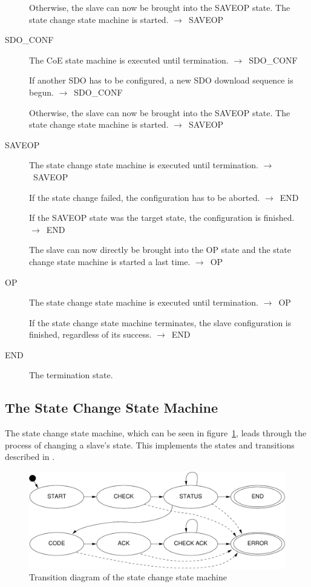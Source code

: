 \documentclass[a4paper,12pt,BCOR6mm,bibtotoc,idxtotoc]{scrbook}
\begin{document}
\begin{description}
  Otherwise, the slave can now be brought into the SAVEOP state. The
  state change state machine is started.
  $\rightarrow$~SAVEOP

\item[SDO\_CONF] The CoE state machine is executed until termination.
  $\rightarrow$~SDO\_CONF

  If another SDO has to be configured, a new SDO download sequence is
  begun. $\rightarrow$~SDO\_CONF

  Otherwise, the slave can now be brought into the SAVEOP state. The
  state change state machine is started.
  $\rightarrow$~SAVEOP

\item[SAVEOP] The state change state machine is executed until
  termination. $\rightarrow$~SAVEOP

  If the state change failed, the configuration has to be aborted.
  $\rightarrow$~END

  If the SAVEOP state was the target state, the configuration is
  finished. $\rightarrow$~END

  The slave can now directly be brought into the OP state and the
  state change state machine is started a last time.
  $\rightarrow$~OP

\item[OP] The state change state machine is executed until
  termination. $\rightarrow$~OP

  If the state change state machine terminates, the slave
  configuration is finished, regardless of its success.
  $\rightarrow$~END

\item[END] The termination state.

\end{description}


\subsection{The State Change State Machine}
\label{sec:fsm-change}

The state change state machine, which can be seen in
figure~\ref{fig:fsm-change}, leads through the process of changing a
slave's state. This implements the states and transitions described in
\cite[section~6.4.1]{alspec}.

\begin{figure}[htbp]
  \centering
  \includegraphics[width=.9\textwidth]{images/fsm-change}
  \caption{Transition diagram of the state change state machine}
  \label{fig:fsm-change}
\end{figure}
\end{document}
